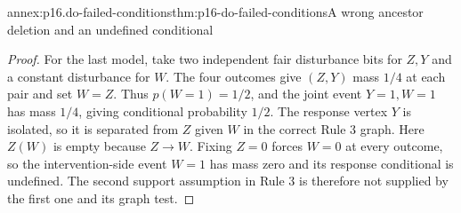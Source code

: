 \begin{annexitem}{annex:p16.do-failed-conditions}{thm:p16-do-failed-conditions}{A wrong ancestor deletion and an undefined conditional}
\begin{proof}
For the last model, take two independent fair disturbance bits for
\(Z,Y\) and a constant disturbance for \(W\). The four outcomes
give \((Z,Y)\) mass \(1/4\) at each pair and set \(W=Z\).
Thus \(p(W=1)=1/2\), and the joint event \(Y=1,W=1\) has
mass \(1/4\), giving conditional probability \(1/2\). The
response vertex \(Y\) is isolated, so it is separated from \(Z\)
given \(W\) in the correct Rule 3 graph. Here \(Z(W)\) is
empty because \(Z\to W\). Fixing \(Z=0\) forces \(W=0\)
at every outcome, so the intervention-side event \(W=1\) has
mass zero and its response conditional is undefined. The second
support assumption in Rule 3 is therefore not supplied by the first
one and its graph test.
\end{proof}
\end{annexitem}
